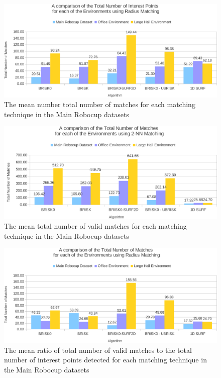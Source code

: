 \documentclass{report}
\begin{document}
\begin{figure}
  \centering
    \includegraphics[width=1.0\textwidth]{../Drawings/Graphs/overall_tn_ip_radius.pdf}
    \caption{The mean number total number of matches for each matching technique in the Main Robocup datasets} 
    \label{fig:overall_tn_ip_radius}
\end{figure}

\begin{figure}
  \centering
    \includegraphics[width=1.0\textwidth]{../Drawings/Graphs/overall_tnm.pdf}
    \caption{The mean total number of valid matches for each matching technique in the Main Robocup datasets} 
    \label{fig:overall_tnm}
\end{figure}

\begin{figure}
  \centering
    \includegraphics[width=1.0\textwidth]{../Drawings/Graphs/overall_tnm_radius.pdf}
    \caption{The mean ratio of total number of valid matches to the total number of interest points detected for each matching technique in the Main Robocup datasets} 
    \label{fig:overall_tnm_radius}
\end{figure}
\end{document}
